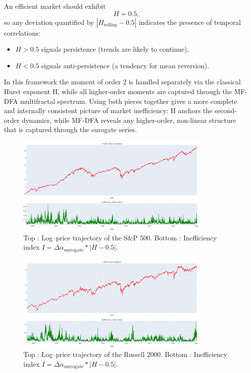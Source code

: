 \documentclass[11pt]{extarticle}
\begin{document}
An efficient market should exhibit
\begin{equation}
H = 0.5,
\end{equation}
so any deviation quantified by $\left|H_{\text{rolling}} - 0.5\right|$ indicates the presence of temporal correlations:
\begin{itemize}
    \item $H>0.5$ signals persistence (trends are likely to continue),
    \item $H<0.5$ signals anti-persistence (a tendency for mean reversion).
\end{itemize}

In this framework the moment of order 2 is handled separately via the classical Hurst exponent H, while all higher-order moments are captured through the MF-DFA multifractal spectrum.
Using both pieces together gives a more complete and internally consistent picture of market inefficiency:
H anchors the second-order dynamics, while MF-DFA reveals any higher-order, non-linear structure that is captured through the surogate series.



\begin{figure}[ht]
    \centering
    \includegraphics[width=0.85\textwidth]{img/price_and_inefficiency_sp500_mrs}
    \caption{Top : Log–price trajectory of the S\&P 500. Bottom : Inefficiency index \(I=\Delta\alpha_{\text{surrogate}} * |H-0.5|\).}
    \label{fig:sp500-inefficiency}
\end{figure}
\FloatBarrier

\begin{figure}[ht]
    \centering
    \includegraphics[width=0.85\textwidth]{img/price_and_inefficiency_russell_mrs}
    \caption{Top : Log–price trajectory of the Russell 2000. Bottom : Inefficiency index \(I=\Delta\alpha_{\text{surrogate}} * |H-0.5|\).}
    \label{fig:russell-inefficiency}
\end{figure}
\FloatBarrier
\end{document}
